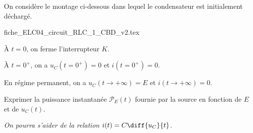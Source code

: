 

\finEntrainement



\newpage




\hauteurLargeurCadreReponse		{8mm}{4cm}
\typeEntrainement				{} %
\initialisationEntrainement


On considère le montage ci-dessous dans lequel le condensateur est initialement déchargé.


\begin{center}
{fiche_ELC04_circuit_RLC_1_CBD_v2.tex}
\end{center}

\`A $t=0$, on ferme l'interrupteur $K$.

À $t=0^+$, on a $u_C(t=0^+)=0$ et 
$i(t=0^+)=0$. 

En régime permanent, on a $u_C(t\rightarrow +\infty)=E$ et $i(t\rightarrow +\infty)=0$.

\bigskip


\debutEntrainement



\begin{enonce}
Exprimer la puissance instantanée $\mathcal{P}_E(t)$ fournie par la source en fonction de $E$ et de $u_C(t)$.

{\itshape On pourra s'aider de la relation $i(t)=C\diff{u_C}{t}$.} \minusBigskip

\end{enonce}

